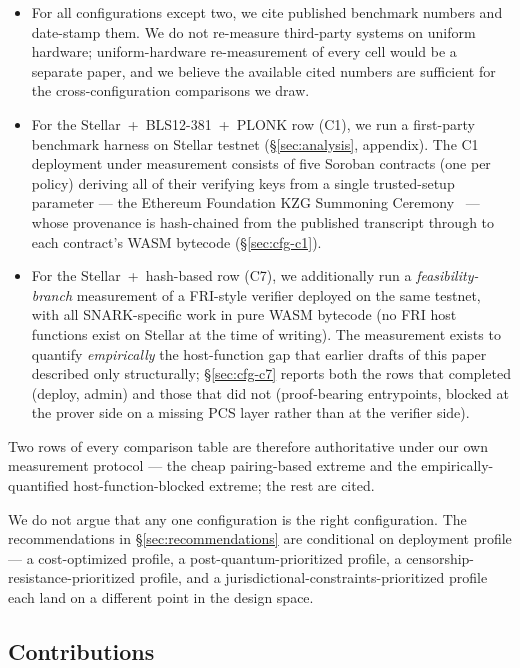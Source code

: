 \begin{itemize}
  \item For all configurations except two, we cite published
    benchmark numbers and date-stamp them. We do not re-measure
    third-party systems on uniform hardware; uniform-hardware
    re-measurement of every cell would be a separate paper, and we
    believe the available cited numbers are sufficient for the
    cross-configuration comparisons we draw.
  \item For the Stellar~+~BLS12-381~+~PLONK row (C1), we run a
    first-party benchmark harness on Stellar testnet
    (\S\ref{sec:analysis}, appendix). The C1 deployment under
    measurement consists of five Soroban contracts (one per policy)
    deriving all of their verifying keys from a single trusted-setup
    parameter --- the Ethereum Foundation KZG Summoning
    Ceremony~\cite{eth-kzg-ceremony} --- whose provenance is
    hash-chained from the published transcript through to each
    contract's WASM bytecode (\S\ref{sec:cfg-c1}).
  \item For the Stellar~+~hash-based row (C7), we additionally run a
    \emph{feasibility-branch} measurement of a FRI-style verifier
    deployed on the same testnet, with all SNARK-specific work in
    pure WASM bytecode (no FRI host functions exist on Stellar at
    the time of writing). The measurement exists to quantify
    \emph{empirically} the host-function gap that earlier drafts of
    this paper described only structurally; \S\ref{sec:cfg-c7}
    reports both the rows that completed (deploy, admin) and those
    that did not (proof-bearing entrypoints, blocked at the prover
    side on a missing PCS layer rather than at the verifier side).
\end{itemize}

Two rows of every comparison table are therefore authoritative under
our own measurement protocol --- the cheap pairing-based extreme and
the empirically-quantified host-function-blocked extreme; the rest
are cited.

We do not argue that any one configuration is the right configuration.
The recommendations in \S\ref{sec:recommendations} are conditional on
deployment profile --- a cost-optimized profile, a
post-quantum-prioritized profile, a censorship-resistance-prioritized
profile, and a jurisdictional-constraints-prioritized profile each
land on a different point in the design space.

\subsection*{Contributions}

